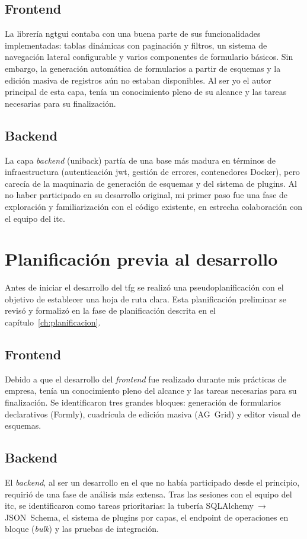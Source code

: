 \subsection{Frontend}
\label{subsec:estado-frontend}

La librería \gls{ngtgui} contaba con una buena parte de sus funcionalidades implementadas:
tablas dinámicas con paginación y filtros, un sistema de navegación lateral configurable y
varios componentes de formulario básicos. Sin embargo, la generación automática de
formularios a partir de esquemas y la edición masiva de registros aún no estaban
disponibles. Al ser yo el autor principal de esta capa, tenía un conocimiento pleno de su
alcance y las tareas necesarias para su finalización.

\subsection{Backend}
\label{subsec:estado-backend}

La capa \textit{backend} (\gls{uniback}) partía de una base más madura en términos de
infraestructura (autenticación \gls{jwt}, gestión de errores, contenedores Docker), pero
carecía de la maquinaria de generación de esquemas y del sistema de plugins. Al no haber
participado en su desarrollo original, mi primer paso fue una fase de exploración y
familiarización con el código existente, en estrecha colaboración con el equipo del
\gls{itc}.

\section{Planificación previa al desarrollo}
\label{sec:planificacion-previa}

Antes de iniciar el desarrollo del \gls{tfg} se realizó una pseudoplanificación con el
objetivo de establecer una hoja de ruta clara. Esta planificación preliminar se revisó y
formalizó en la fase de planificación descrita en el
capítulo~\ref{ch:planificacion}.

\subsection{Frontend}
\label{subsec:plan-frontend}

Debido a que el desarrollo del \textit{frontend} fue realizado durante mis prácticas de
empresa, tenía un conocimiento pleno del alcance y las tareas necesarias para su
finalización. Se identificaron tres grandes bloques: generación de formularios declarativos
(Formly), cuadrícula de edición masiva (AG~Grid) y editor visual de esquemas.

\subsection{Backend}
\label{subsec:plan-backend}

El \textit{backend}, al ser un desarrollo en el que no había participado desde el
principio, requirió de una fase de análisis más extensa. Tras las sesiones con el equipo
del \gls{itc}, se identificaron como tareas prioritarias: la tubería SQLAlchemy~→
JSON~Schema, el sistema de plugins por capas, el endpoint de operaciones en bloque
(\textit{bulk}) y las pruebas de integración.
